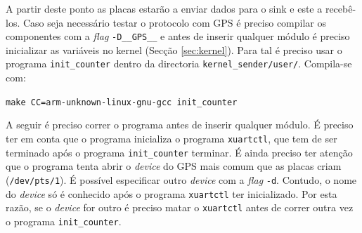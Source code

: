 \documentclass[10pt,a4paper,oneside]{book}
\begin{document}
	A partir deste ponto as placas estarão a enviar dados para o sink e este a recebê-los. Caso seja necessário testar o protocolo com GPS é preciso compilar os componentes com a \emph{flag} {\tt -D\_\_GPS\_\_} e antes de inserir qualquer módulo é preciso inicializar as variáveis no kernel (Secção \ref{sec:kernel}). Para tal é preciso usar o programa {\tt init\_counter} dentro da directoria {\tt kernel\_sender/user/}. Compila-se com:
        
        \begin{center}
          {\tt make CC=arm-unknown-linux-gnu-gcc init\_counter}
        \end{center}
	
        A seguir é preciso correr o programa antes de inserir qualquer módulo. É preciso ter em conta que o programa inicializa o programa {\tt xuartctl}, que tem de ser terminado após o programa {\tt init\_counter} terminar. É ainda preciso ter atenção que o programa tenta abrir o \emph{device} do GPS mais comum que as placas criam ({\tt /dev/pts/1}). É possível especificar outro \emph{device} com a \emph{flag} {\tt -d}. Contudo, o nome do \emph{device} só é conhecido após o programa {\tt xuartctl} ter inicializado. Por esta razão, se o \emph{device} for outro é preciso matar o {\tt xuartctl} antes de correr outra vez o programa {\tt init\_counter}.
\end{document}
